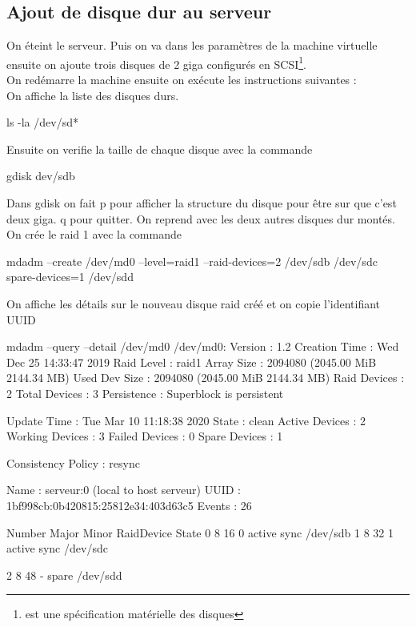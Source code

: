 \documentclass[a4paper,12pt,french]{report} %
\begin{document}
\subsection{Ajout de disque dur au serveur}	
	On éteint le serveur. Puis on va dans les paramètres de la machine virtuelle ensuite on ajoute trois disques de 2 giga configurés en SCSI\footnote{ est une spécification matérielle des disques}.\\
On redémarre la machine ensuite on exécute les instructions suivantes : \\
On affiche la liste des disques durs. 
\begin{exempleConsole}
ls -la /dev/sd* 
\end{exempleConsole}

Ensuite on verifie la taille de chaque disque avec la commande
\begin{exempleConsole}
gdisk dev/sdb
\end{exempleConsole}

 Dans gdisk on fait p pour afficher la structure du disque pour être sur que c'est deux giga. q  pour quitter. On reprend avec les deux autres disques dur montés. \\
 On crée le raid 1 avec la commande  
\begin{exempleConsole}
mdadm --create /dev/md0 --level=raid1 --raid-devices=2 /dev/sdb /dev/sdc spare-devices=1 /dev/sdd
\end{exempleConsole}

On affiche les détails sur le nouveau disque raid créé et on copie l'identifiant UUID
\begin{exempleConsole}
mdadm --query --detail /dev/md0
/dev/md0:
           Version : 1.2
     Creation Time : Wed Dec 25 14:33:47 2019
        Raid Level : raid1
        Array Size : 2094080 (2045.00 MiB 2144.34 MB)
     Used Dev Size : 2094080 (2045.00 MiB 2144.34 MB)
      Raid Devices : 2
     Total Devices : 3
       Persistence : Superblock is persistent

       Update Time : Tue Mar 10 11:18:38 2020
             State : clean
    Active Devices : 2
   Working Devices : 3
    Failed Devices : 0
     Spare Devices : 1

Consistency Policy : resync

              Name : serveur:0  (local to host serveur)
              UUID : 1bf998cb:0b420815:25812e34:403d63c5
            Events : 26

    Number   Major   Minor   RaidDevice State
       0       8       16        0      active sync   /dev/sdb
       1       8       32        1      active sync   /dev/sdc

       2       8       48        -      spare   /dev/sdd

\end{exempleConsole}
\end{document}
